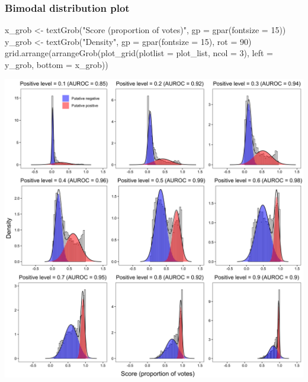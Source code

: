 \documentclass[
  11pt,
  oneside]{book}
\newenvironment{Shaded}{\begin{snugshade}}{\end{snugshade}}
\newcommand{\AttributeTok}[1]{\textcolor[rgb]{0.77,0.63,0.00}{#1}}
\newcommand{\DecValTok}[1]{\textcolor[rgb]{0.00,0.00,0.81}{#1}}
\newcommand{\FunctionTok}[1]{\textcolor[rgb]{0.00,0.00,0.00}{#1}}
\newcommand{\NormalTok}[1]{#1}
\newcommand{\OtherTok}[1]{\textcolor[rgb]{0.56,0.35,0.01}{#1}}
\newcommand{\StringTok}[1]{\textcolor[rgb]{0.31,0.60,0.02}{#1}}
\begin{document}
\hypertarget{bimodal-distribution-plot-1}{%
\subsubsection{Bimodal distribution plot}\label{bimodal-distribution-plot-1}}

\begin{Shaded}
\begin{Highlighting}[]
\NormalTok{x\_grob }\OtherTok{\textless{}{-}} \FunctionTok{textGrob}\NormalTok{(}\StringTok{"Score (proportion of votes)"}\NormalTok{, }\AttributeTok{gp =} \FunctionTok{gpar}\NormalTok{(}\AttributeTok{fontsize =} \DecValTok{15}\NormalTok{))}
\NormalTok{y\_grob }\OtherTok{\textless{}{-}} \FunctionTok{textGrob}\NormalTok{(}\StringTok{"Density"}\NormalTok{, }\AttributeTok{gp =} \FunctionTok{gpar}\NormalTok{(}\AttributeTok{fontsize =} \DecValTok{15}\NormalTok{), }\AttributeTok{rot =} \DecValTok{90}\NormalTok{)}
\FunctionTok{grid.arrange}\NormalTok{(}\FunctionTok{arrangeGrob}\NormalTok{(}\FunctionTok{plot\_grid}\NormalTok{(}\AttributeTok{plotlist =}\NormalTok{ plot\_list, }\AttributeTok{ncol =} \DecValTok{3}\NormalTok{), }\AttributeTok{left =}\NormalTok{ y\_grob, }\AttributeTok{bottom =}\NormalTok{ x\_grob))}
\end{Highlighting}
\end{Shaded}

\begin{center}\includegraphics[width=1\linewidth]{./figures/Supplementary Fig 5} \end{center}
\end{document}
